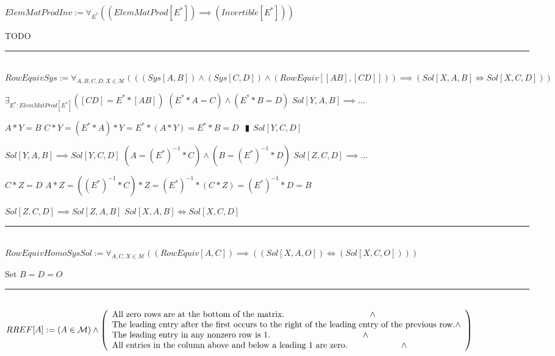 \documentclass{book}
\newcommand{\abr}{:=}
\newcommand{\pipe}{$\phantom{(}\vrectangleblack\phantom{)}$}
\newcommand{\pr}[1]{\left(#1\right)}
\begin{document}
$ElemMatProdInv \abr \forall_{E^*}\pr{(ElemMatProd[E^*]) \implies (Invertible[E^*])}$
\begin{enumerate}
  \lit TODO
\end{enumerate} \vspace{.75mm} \hrule \vspace{.75mm} \ \\ 

$RowEquivSys \abr \forall_{A, B, C, D, X \in \mathcal{M}}\pr{\pr{(Sys[A, B]) \land (Sys[C, D]) \land (RowEquiv[[A B], [C D]])} \implies (Sol[X, A, B] \iff Sol[X, C, D])}$
\begin{enumerate}
  \lit $\exists_{E^* : ElemMatProd[E^*]}([C D] = E^* * [A B])$
  \lit $(E^* * A = C) \land (E^* * B = D)$
  \lit $Sol[Y, A, B] \implies \ldots$
  \begin{enumerate}
    \lit $A * Y = B$
    \lit $C * Y = (E^* * A) * Y = E^* * (A * Y) = E^* * B = D$ \pipe $Sol[Y, C, D]$
  \end{enumerate}
  \lit $Sol[Y, A, B] \implies Sol[Y, C, D]$
  \lit $\pr{A = (E^*)^{-1} * C} \land \pr{B = (E^*)^{-1} * D}$
  \lit $Sol[Z, C, D] \implies \ldots$
  \begin{enumerate}
    \lit $C * Z = D$
    \lit $A * Z = \pr{(E^*)^{-1} * C} * Z = (E^*)^{-1} * (C * Z) = (E^*)^{-1} * D = B$
  \end{enumerate}
  \lit $Sol[Z, C, D] \implies Sol[Z, A, B]$
  \lit $Sol[X, A, B] \iff Sol[X, C, D]$
\end{enumerate} \vspace{.75mm} \hrule \vspace{.75mm} \ \\ 

$RowEquivHomoSysSol \abr \forall_{A, C, X \in \mathcal{M}}\pr{(RowEquiv[A, C]) \implies \pr{(Sol[X, A, O]) \iff (Sol[X, C, O])}}$
\begin{enumerate}
  \lit Set $B = D = O$
\end{enumerate} \vspace{.75mm} \hrule \vspace{.75mm} \ \\ 

$RREF[A] \abr (A \in \mathcal{M}) \land \left(\begin{array}{ll}
  \text{All zero rows are at the bottom of the matrix.} \hfill \land \hfill \\
  \text{The leading entry after the first occurs to the right of the leading entry of the previous row.} \hfill \land \hfill \\
  \text{The leading entry in any nonzero row is 1.} \hfill \land \hfill \\
  \text{All entries in the column above and below a leading 1 are zero.} \hfill \land \hfill \\
\end{array}\right)$ \\
\end{document}
